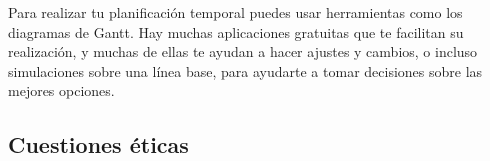 {Para realizar tu planificación temporal puedes usar herramientas como los diagramas de Gantt. Hay muchas aplicaciones gratuitas que te facilitan su realización, y muchas de ellas te ayudan a hacer ajustes y cambios, o incluso simulaciones sobre una línea base, para ayudarte a tomar decisiones sobre las mejores opciones. 


\subsection{Cuestiones éticas}%

}
